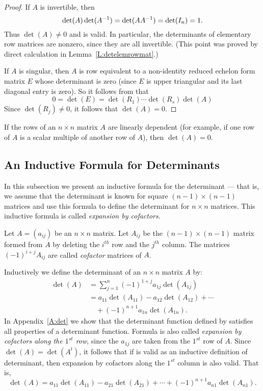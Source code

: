 \documentclass{ximera}
\begin{document}
\begin{proof}  If $A$ is invertible, then 
\[
\det(A)\det(A^{-1}) = \det(AA^{-1}) = \det(I_n) =1.
\]
Thus $\det(A)\neq 0$ and  is valid. In particular, the 
determinants of elementary row matrices are nonzero, since they are all
invertible. (This point was proved by direct calculation in
Lemma~\ref{L:detelemrowmat}.)
 
If $A$ is singular, then $A$ is row equivalent to a non-identity
reduced echelon form matrix $E$ whose determinant is zero (since
$E$ is upper triangular and its last diagonal entry is zero).
So it follows from
 that 
\[
0=\det(E) = \det(R_1)\cdots\det(R_s)\det(A)
\]
Since $\det(R_j)\neq 0$, it follows that $\det(A)=0$.  \end{proof}

\begin{corollary}
If the rows of an $n\times n$ matrix $A$ are linearly dependent (for example,
if one row of $A$ is a scalar multiple of another row of $A$), then 
$\det(A)=0$.
\end{corollary}


\subsection*{An Inductive Formula for Determinants} 
 
In this subsection we present an inductive formula for the
determinant --- that is, we assume that the determinant is known
for square $(n-1)\times(n-1)$ matrices and use this formula to
define the determinant for $n\times n$ matrices.  This inductive formula
is called {\em expansion by cofactors\/}.
 
Let $A=(a_{ij})$ be an $n\times n$ matrix.  Let $A_{ij}$ be the
$(n-1)\times(n-1)$ matrix formed from $A$ by deleting the
$i^{th}$ row and the $j^{th}$ column.  The matrices $(-1)^{i+j}A_{ij}$ are
called {\em cofactor\/}  matrices of $A$.  

Inductively we define the determinant of an $n\times n$ matrix $A$ by:
\begin{align}
\det(A) & = \sum^n_{j=1} (-1)^{1+j}a_{1j}\det(A_{1j}) \nonumber
\\  & = 
      a_{11}\det(A_{11})-a_{12}\det(A_{12})+\cdots \nonumber\\
  & \quad +(-1)^{n+1}a_{1n}\det(A_{1n}).
    \label{e:inductdet}
\end{align} 
In Appendix~\ref{A:det} we show that the determinant function defined by 
 satisfies all properties of a determinant function.
Formula  is also called {\em expansion by cofactors along 
the $1^{st}$ row\/}, since the $a_{1j}$ are taken from the $1^{st}$ row 
of $A$.  Since $\det(A)=\det(A^t)$, it follows that if  is 
valid as an inductive definition of determinant, then expansion by cofactors 
along the $1^{st}$ column is also valid.  That is,
\begin{equation}  \label{e:inductdetc}
\det(A) = 
a_{11}\det(A_{11})-a_{21}\det(A_{21})+\cdots+(-1)^{n+1}a_{n1}\det(A_{n1}).
\end{equation} 
\end{document}
